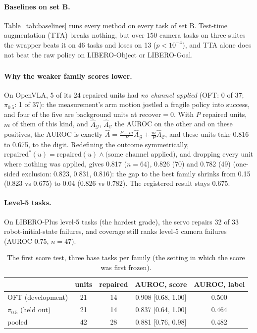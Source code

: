 \documentclass{article}
\newcommand{\recover}{\mathrm{recover}}
\newcommand{\pihalf}{$\pi_{0.5}$}
\newcommand{\ph}{\textsuperscript{\dag}}
\begin{document}
\paragraph{Baselines on set B.} Table~\ref{tab:baselines} runs every method on every task of set B. Test-time
augmentation (TTA) breaks nothing, but over 150 camera tasks on three suites the wrapper beats it on 46 tasks and loses
on 13 ($p<10^{-4}$), and TTA alone does not beat the raw policy on LIBERO-Object or LIBERO-Goal.

\paragraph{Why the weaker family scores lower\ph.} On OpenVLA, 5 of its 24 repaired units had \emph{no channel applied}
(OFT: 0 of 37; \pihalf: 1 of 37): the measurement's arm motion jostled a fragile policy into success, and four of the
five are background units at $\recover = 0$. With $P$ repaired units, $m$ of them of this kind, and $\widehat
A_{\mathcal G}$, $\widehat A_{\mathcal C}$ the AUROC on the other and on these positives, the AUROC is exactly
$\widehat A = \tfrac{P-m}{P}\widehat A_{\mathcal G} + \tfrac{m}{P}\widehat A_{\mathcal C}$,
and these units take 0.816 to 0.675, to the digit. Redefining the outcome symmetrically, $\mathrm{repaired}^*(u) =
\mathrm{repaired}(u) \wedge \text{(some channel applied)}$, and dropping every unit where nothing was applied, gives
0.817 ($n = 64$), 0.826 (70) and 0.782 (49) (one-sided exclusion: 0.823, 0.831, 0.816): the gap to the best family
shrinks from 0.15 (0.823 vs 0.675) to 0.04 (0.826 vs 0.782). The registered result stays 0.675.

\paragraph{Level-5 tasks.} On LIBERO-Plus level-5 tasks (the hardest grade), the servo repairs 32 of 33
robot-initial-state failures, and coverage still ranks level-5 camera failures (AUROC 0.75, $n = 47$).

\begin{table}[h]
\centering\small
\caption{The first score test, three base tasks per family (the setting in which the score was first frozen).}
\label{tab:first}
\begin{tabular}{lcccc}
\toprule
 & units & repaired & AUROC, score & AUROC, label \\
\midrule
OFT (development) & 21 & 14 & 0.908 [0.68, 1.00] & 0.500 \\
\pihalf{} (held out) & 21 & 14 & 0.837 [0.64, 1.00] & 0.464 \\
pooled & 42 & 28 & 0.881 [0.76, 0.98] & 0.482 \\
\bottomrule
\end{tabular}
\end{table}
\end{document}

